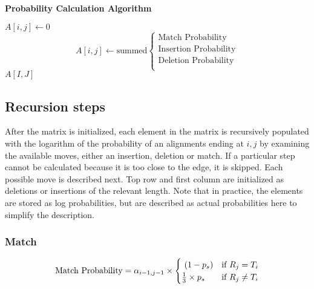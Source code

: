 \documentclass[fleqn,10pt]{SelfArx} %
\begin{document}
\begin{algorithm}
\caption*{\textbf{Probability Calculation Algorithm}}
\label{calcScore}
\begin{algorithmic}[h]
\STATE $A[i,j] \leftarrow 0$
\ELSE
\STATE \[
	A[i,j]  \leftarrow \text{summed}
\begin{cases}
	\text{Match Probability} \\
	\text{Insertion Probability} \\
	\text{Deletion Probability} \\
   	\end{cases}
\]
\ENDIF	
\ENDFOR
\ENDFOR
\RETURN $A[I,J]$
\end{algorithmic}
\end{algorithm}





\subsection{Recursion steps}
After the matrix is initialized, each element in the matrix is recursively populated with the logarithm of the probability of an alignments ending at $i,j$ by examining the available moves, either an insertion, deletion or match.  If a particular step cannot be calculated because it is too close to the edge, it is skipped.  Each possible move is described next.  Top row and first column are initialized as deletions or insertions of the relevant length.  Note that in practice, the elements are stored as log probabilities, but are described as actual probabilities here to simplify the description.






\subsubsection{\textbf{Match}}


\begin{dmath}
\text{Match Probability} = \\
	 \alpha_{i-1,j-1}  \times 
	 \begin{cases}
							 \ (1-p_{s}) & \text{if }  R_{j} = T_{i} \\
							 \frac{1}{3} \times p_{s}  & \text{if }  R_{j}  \neq T_{i} 
							 \end{cases}
\end{dmath}
\end{document}
